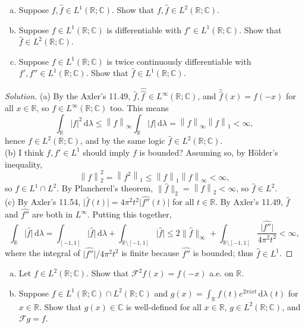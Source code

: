 \documentclass[10pt]{article}
\newcommand{\dd}{\,\mathrm{d}}
\providecommand{\CC}{\mathbb C}
\providecommand{\RR}{\mathbb R}
\providecommand{\ii}{\item}
\newcommand{\what}{\widehat}
\newenvironment{soln}{\begin{proof}[Solution]}{\end{proof}}
\providecommand{\abs}[1]{\left\lvert #1\right\rvert}
\providecommand{\smabs}[1]{\lvert #1\rvert}
\providecommand{\norm}[1]{\left\| #1\right\|}
\providecommand{\smnorm}[1]{\| #1\|}
\begin{document}
\pagebreak

\begin{problem}
    \begin{enumerate}[(a)]
        \ii Suppose $f,\what f\in L^1(\RR;\CC)$.
	Show that $f,\what f\in L^2(\RR;\CC)$.
	\ii Suppose $f\in L^1(\RR;\CC)$ is differentiable
	with $f'\in L^1(\RR;\CC)$. Show that $\what f\in L^2(\RR;\CC)$.
	\ii Suppose $f\in L^1(\RR;\CC)$ is twice continuously differentiable
	with $f',f''\in L^1(\RR;\CC)$. Show that $\what f\in L^1(\RR;\CC)$.
    \end{enumerate}
\end{problem}

\begin{soln}
    (a) By the Axler's 11.49, $\what f,\widehat{\widehat{f\,}}\!\!
    \in L^\infty(\RR;\CC)$, and $\hat{\hat f}(x) = f(-x)$ for all $x\in\RR$,
    so $f\in L^\infty(\RR;\CC)$ too. This means
    \begin{equation*}
	\int_{\RR}\abs{f}^2\dd\lambda
	\le \norm{f}_\infty \int_\RR\abs{f}\dd\lambda
	= \norm{f}_\infty\norm{f}_1 < \infty,
    \end{equation*}
    hence $f\in L^2(\RR;\CC)$, and
    by the same logic $\what f\in L^2(\RR;\CC)$.
    \\

    (b) I think $f,f'\in L^1$ should imply $f$ is bounded? Assuming so,
    by H\"older's inequality,
    \begin{equation*}
	\norm{f}_2^2 = \norm{f^2}_1 \le \norm{f}_1\norm{f}_\infty < \infty,
    \end{equation*}
    so $f\in L^1\cap L^2$. By Plancherel's theorem,
    $\smnorm{\what f}_2 = \norm{f}_2 < \infty$, so $\what f\in L^2$.
    \\

    (c) By Axler's 11.54, $\smabs{\what f(t)} = 4\pi^2 t^2\smabs{\what{f''}(t)}$
    for all $t\in\RR$. By Axler's 11.49, $\what f$ and $\what{f''}$
    are both in $L^\infty$. Putting this together,
    \begin{equation*}
	\int_\RR\smabs{\what f}\dd\lambda
	= \int_{[-1,1]}\smabs{\what f}\dd\lambda
	+ \int_{\RR\setminus[-1,1]}\smabs{\what f}
	\le 2\smnorm{\what f}_\infty
	+ \int_{\RR\setminus[-1,1]}\frac{\smabs{\what{f''}}}{4\pi^2t^2} < \infty,
    \end{equation*}
    where the integral of $\smabs{\what{f''}}/4\pi^2t^2$ is finite
    because $\what{f''}$ is bounded; thus $\what f\in L^1$.
\end{soln}

\begin{problem}
    \begin{enumerate}[(a)]
        \ii Let $f\in L^2(\RR;\CC)$. Show that $\mathcal F^2f(x) = f(-x)$
	a.e. on $\RR$.
	\ii Suppose $f\in L^1(\RR;\CC)\cap L^2(\RR;\CC)$ and
	$g(x) = \int_\RR f(t) e^{2\pi ixt}\dd\lambda(t)$ for $x\in\RR$.
	Show that $g(x)\in\CC$ is well-defined for all $x\in\RR$,
	$g\in L^2(\RR;\CC)$, and $\mathcal Fg = f$.
    \end{enumerate}
\end{problem}
\end{document}
